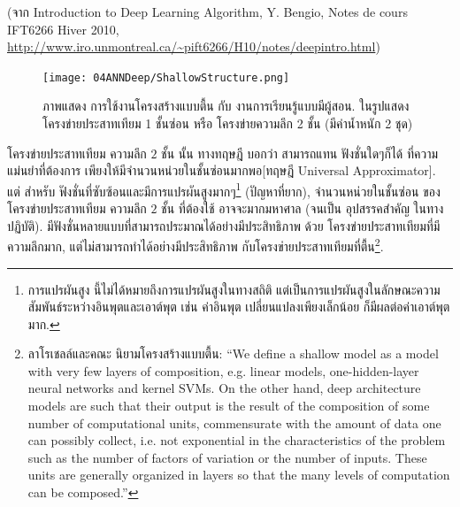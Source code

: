 (จาก Introduction to Deep Learning Algorithm, Y. Bengio, Notes de cours IFT6266 Hiver 2010, \url{http://www.iro.unmontreal.ca/~pift6266/H10/notes/deepintro.html})

%
\begin{figure}
\centering

\texttt{[image: 04ANNDeep/ShallowStructure.png]}
\label{fig: deep shallow structure}

\caption{ภาพแสดง การใช้งานโครงสร้างแบบตื้น กับ งานการเรียนรู้แบบมีผู้สอน.
  ในรูปแสดง โครงข่ายประสาทเทียม 1 ชั้นซ่อน หรือ โครงข่ายความลึก 2 ชั้น (มีค่าน้ำหนัก 2 ชุด)}

\end{figure}
%

โครงข่ายประสาทเทียม ความลึก $2$ ชั้น นั้น ทางทฤษฎี บอกว่า สามารถแทน ฟังชั่นใดๆก็ได้ ที่ความแม่นยำที่ต้องการ เพียงให้มีจำนวนหน่วยในชั้นซ่อนมากพอ\cite{Cybenko1989a, Hornik1991a, Bishop2006a}[ทฤษฎี Universal Approximator].
แต่ สำหรับ ฟังชั่นที่ซับซ้อนและมีการแปรผันสูงมากๆ\footnote{
การแปรผันสูง นี้ไม่ได้หมายถึงการแปรผันสูงในทางสถิติ แต่เป็นการแปรผันสูงในลักษณะความสัมพันธ์ระหว่างอินพุตและเอาต์พุต เช่น ค่าอินพุต เปลี่ยนแปลงเพียงเล็กน้อย ก็มีผลต่อค่าเอาต์พุต มาก.
} (ปัญหาที่ยาก), จำนวนหน่วยในชั้นซ่อน ของ โครงข่ายประสาทเทียม ความลึก $2$ ชั้น ที่ต้องใช้ อาจจะมากมหาศาล (จนเป็น อุปสรรคสำคัญ ในทางปฏิบัติ).
มีฟังชั่นหลายแบบที่สามารถประมาณได้อย่างมีประสิทธิภาพ ด้วย โครงข่ายประสาทเทียมที่มีความลึกมาก,
แต่ไม่สามารถทำได้อย่างมีประสิทธิภาพ กับโครงข่ายประสาทเทียมที่ตื้น\footnote{
ลาโรเชลล์และคณะ นิยามโครงสร้างแบบตื้น:
``We define a shallow model as a model with very few layers of composition, 
e.g. linear models, one-hidden-layer
neural networks and kernel SVMs. 
On the other hand, deep architecture models are
such that their output is the result of the composition
of some number of computational units, 
commensurate with the amount of data one can possibly collect,
i.e. not exponential in the characteristics of the problem
such as the number of factors of variation or the number of inputs. These units are generally organized in layers so that the many levels of computation can be composed.''\cite{LarochelleEtAl2007a}
}.

